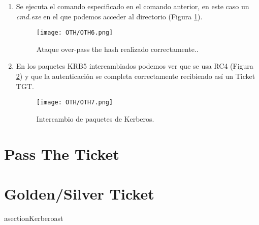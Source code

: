 \begin{enumerate}
\item Se ejecuta el comando especificado en el comando anterior, en este caso un {\it cmd.exe} en el que podemos acceder al directorio (Figura \ref{OTH6}).
\begin{figure}[H] %
\begin{center}
\texttt{[image: OTH/OTH6.png]}
\end{center}
\caption{Ataque over-pass the hash realizado correctamente..}
\label{OTH6}
\end{figure}

\item En los paquetes KRB5 intercambiados podemos ver que se usa RC4 (Figura \ref{OTH7}) y que la autenticación se completa correctamente recibiendo así un Ticket TGT. 
\begin{figure}[H] %
\begin{center}
\texttt{[image: OTH/OTH7.png]}
\end{center}
\caption{Intercambio de paquetes de Kerberos.}
\label{OTH7}
\end{figure}


\end{enumerate}




\section{Pass The Ticket}

\section{Golden/Silver Ticket}

asection{Kerberoast}
